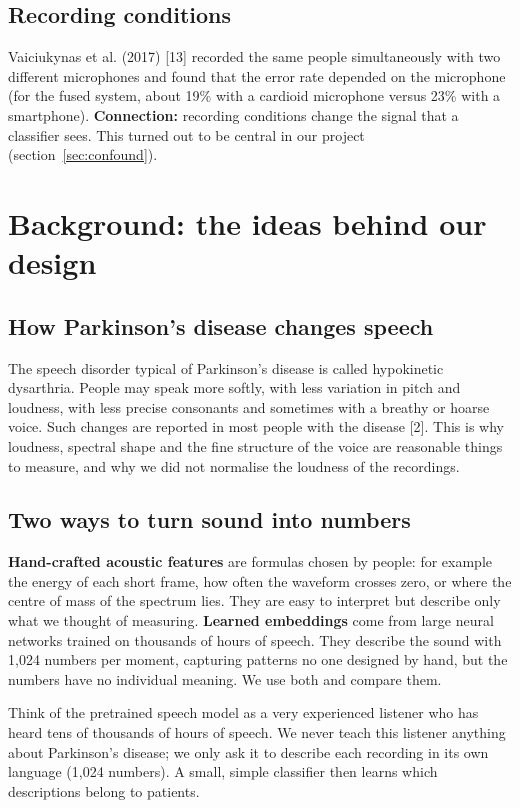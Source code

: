 \documentclass[11pt,a4paper]{article}
\begin{document}
\subsection{Recording conditions}
Vaiciukynas et al. (2017) [13] recorded the same people simultaneously with two different microphones and found that the error rate depended on the microphone (for the fused system, about 19\% with a cardioid microphone versus 23\% with a smartphone). \textbf{Connection:} recording conditions change the signal that a classifier sees. This turned out to be central in our project (section~\ref{sec:confound}).

\section{Background: the ideas behind our design}\label{sec:background}
\subsection{How Parkinson's disease changes speech}
The speech disorder typical of Parkinson's disease is called hypokinetic dysarthria. People may speak more softly, with less variation in pitch and loudness, with less precise consonants and sometimes with a breathy or hoarse voice. Such changes are reported in most people with the disease [2]. This is why loudness, spectral shape and the fine structure of the voice are reasonable things to measure, and why we did not normalise the loudness of the recordings.

\subsection{Two ways to turn sound into numbers}
\textbf{Hand-crafted acoustic features} are formulas chosen by people: for example the energy of each short frame, how often the waveform crosses zero, or where the centre of mass of the spectrum lies. They are easy to interpret but describe only what we thought of measuring. \textbf{Learned embeddings} come from large neural networks trained on thousands of hours of speech. They describe the sound with 1,024 numbers per moment, capturing patterns no one designed by hand, but the numbers have no individual meaning. We use both and compare them.

\begin{tcolorbox}[colback=green!3,colframe=green!40!black,boxrule=0.5pt,arc=2pt,left=5pt,right=5pt,top=3pt,bottom=3pt,title={\small\bfseries In plain words}]\small Think of the pretrained speech model as a very experienced listener who has heard tens of thousands of hours of speech. We never teach this listener anything about Parkinson's disease; we only ask it to describe each recording in its own language (1,024 numbers). A small, simple classifier then learns which descriptions belong to patients.\end{tcolorbox}
\end{document}

